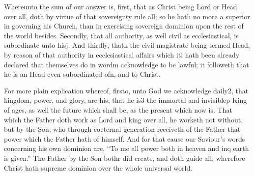 Whereunto the sum of our answer is, first, that as Christ being Lord or Head over all, doth by virtue of that sovereignty rule all; so he hath no more a superior in governing his Church, than in exercising sovereign dominion upon the rest of the world besides. Secondly, that all authority, as well civil as ecclesiastical, is subordinate unto hisj. And thirdly, thatk the civil magistrate being termed Head, by reason of that authority in ecclesiastical affairs which itl hath been already declared that themselves do in wordm acknowledge to be lawful; it followeth that he is an Head even subordinated ofn, and to Christ.

For more plain explication whereof, firsto, unto God we acknowledge daily2, that kingdom, power, and glory, are his; that he is3 the immortal and invisiblep King of ages, as well the future which shall be, as the present which now is. That which the Father doth work as Lord and king over all, he worketh not without, but by the Son, who through coeternal generation receiveth of the Father that power which the Father hath of himself. And for that cause our Saviour’s words concerning his own dominion are, “To me all power both in heaven and inq earth is given.” The Father by the Son bothr did create, and doth guide all; wherefore Christ hath supreme dominion over the whole universal world.

